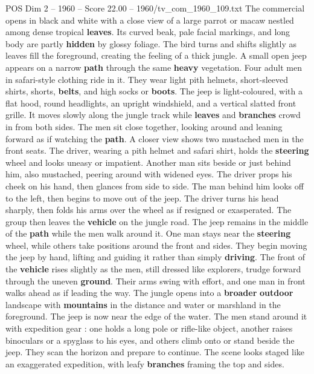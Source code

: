 \begin{textsample}{POS Dim 2 – 1960 – Score 22.00 – 1960/tv\_com\_1960\_109.txt}  \label{ex:f2_pos_006}
The commercial opens in black and white with a close view of a large parrot or macaw nestled among dense tropical \textbf{leaves}.
Its curved beak, pale facial markings, and long body are partly \textbf{hidden} by glossy foliage.
The bird turns and shifts slightly as leaves fill the foreground, creating the feeling of a thick jungle.
A small open jeep appears on a narrow \textbf{path} through the same \textbf{heavy} vegetation.
Four adult men in safari-style clothing ride in it.
They wear light pith helmets, short-sleeved shirts, shorts, \textbf{belts}, and high socks or \textbf{boots}.
The jeep is light-coloured, with a flat hood, round headlights, an upright windshield, and a vertical slatted front grille.
It moves slowly along the jungle track while \textbf{leaves} and \textbf{branches} crowd in from both sides.
The men sit close together, looking around and leaning forward as if watching the \textbf{path}.
A closer view shows two mustached men in the front seats.
The driver, wearing a pith helmet and safari shirt, holds the \textbf{steering} wheel and looks uneasy or impatient.
Another man sits beside or just behind him, also mustached, peering around with widened eyes.
The driver props his cheek on his hand, then glances from side to side.
The man behind him looks off to the left, then begins to move out of the jeep.
The driver turns his head sharply, then folds his arms over the wheel as if resigned or exasperated.
The group then leaves the \textbf{vehicle} on the jungle road.
The jeep remains in the middle of the \textbf{path} while the men walk around it.
One man stays near the \textbf{steering} wheel, while others take positions around the front and sides.
They begin moving the jeep by hand, lifting and guiding it rather than simply \textbf{driving}.
The front of the \textbf{vehicle} rises slightly as the men, still dressed like explorers, trudge forward through the uneven \textbf{ground}.
Their arms swing with effort, and one man in front walks ahead as if leading the way.
The jungle opens into a \textbf{broader} \textbf{outdoor} landscape with \textbf{mountains} in the distance and water or marshland in the foreground.
The jeep is now near the edge of the water.
The men stand around it with expedition gear : one holds a long pole or rifle-like object, another raises binoculars or a spyglass to his eyes, and others climb onto or stand beside the jeep.
They scan the horizon and prepare to continue.
The scene looks staged like an exaggerated expedition, with leafy \textbf{branches} framing the top and sides.

\end{textsample}
